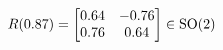 \documentclass[preview]{standalone}
\begin{document}
\begin{align*}
\special{dvisvgm:raw <g id='unique000'>}R(0.87) = \begin{bmatrix} 0.64 & -0.76 \\ 0.76 & 0.64 \end{bmatrix} \in \text{SO}(2)\special{dvisvgm:raw </g>}
\end{align*}
\end{document}
